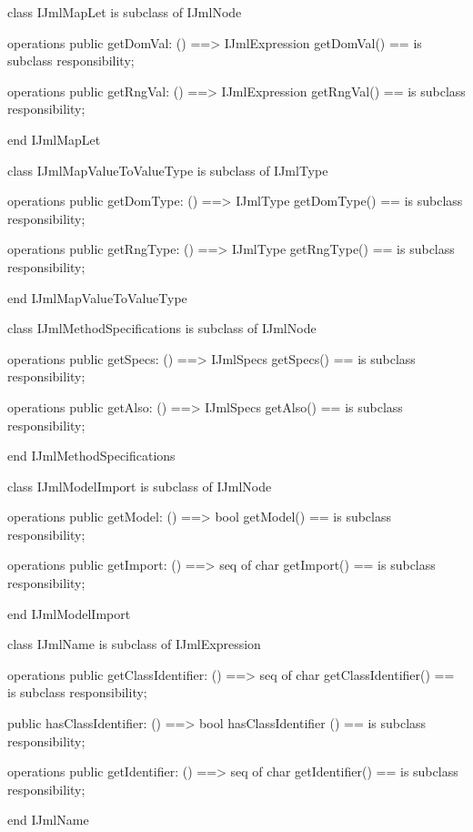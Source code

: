\begin{vdm_al}
class IJmlMapLet
 is subclass of IJmlNode

operations
  public getDomVal: () ==> IJmlExpression
  getDomVal() == is subclass responsibility;

operations
  public getRngVal: () ==> IJmlExpression
  getRngVal() == is subclass responsibility;

end IJmlMapLet
\end{vdm_al}

\begin{vdm_al}
class IJmlMapValueToValueType
 is subclass of IJmlType

operations
  public getDomType: () ==> IJmlType
  getDomType() == is subclass responsibility;

operations
  public getRngType: () ==> IJmlType
  getRngType() == is subclass responsibility;

end IJmlMapValueToValueType
\end{vdm_al}

\begin{vdm_al}
class IJmlMethodSpecifications
 is subclass of IJmlNode

operations
  public getSpecs: () ==> IJmlSpecs
  getSpecs() == is subclass responsibility;

operations
  public getAlso: () ==> IJmlSpecs
  getAlso() == is subclass responsibility;

end IJmlMethodSpecifications
\end{vdm_al}

\begin{vdm_al}
class IJmlModelImport
 is subclass of IJmlNode

operations
  public getModel: () ==> bool
  getModel() == is subclass responsibility;

operations
  public getImport: () ==> seq of char
  getImport() == is subclass responsibility;

end IJmlModelImport
\end{vdm_al}

\begin{vdm_al}
class IJmlName
 is subclass of IJmlExpression

operations
  public getClassIdentifier: () ==> seq of char
  getClassIdentifier() == is subclass responsibility;

  public hasClassIdentifier: () ==> bool
  hasClassIdentifier () == is subclass responsibility;

operations
  public getIdentifier: () ==> seq of char
  getIdentifier() == is subclass responsibility;

end IJmlName
\end{vdm_al}

